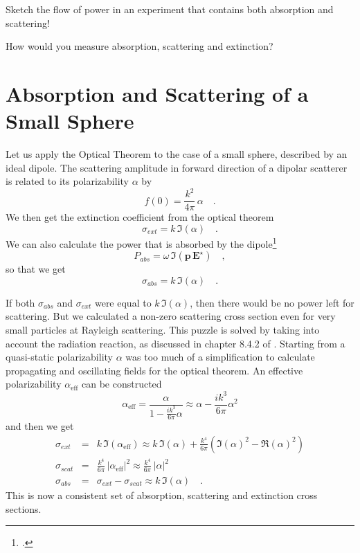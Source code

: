 \begin{questions}
  \item Sketch the flow of power in an experiment that contains both absorption and scattering!
  \item How would you measure absorption, scattering and extinction?
\end{questions}


\section{Absorption and Scattering of a Small Sphere}

Let us apply the Optical Theorem to the case of a small sphere, described by an ideal dipole.
The scattering amplitude in forward direction of a dipolar scatterer is related to its  polarizability $\alpha$ by 
\begin{equation}
 f(0) = \frac{k^2}{4 \pi} \, \alpha \quad .
\end{equation}
We  then get the extinction coefficient from the optical theorem
\begin{equation}
 \sigma_{ext} = k \, \Im ( \alpha ) \quad .
\end{equation}
We can also calculate the power that is absorbed by the dipole\footcite[Chapter 8]{Novotny-Hecht2012}
\begin{equation}
 P_{abs} = \omega \, \Im \left( \mathbf{p} \, \mathbf{E}^\star \right)  \quad ,
\end{equation}
so that we get 
\begin{equation}
 \sigma_{abs} = k \, \Im ( \alpha ) \quad .
\end{equation}

If both $\sigma_{abs}$ and $\sigma_{ext}$ were equal to $k \, \Im ( \alpha )$, then there would be no power left for scattering. But we calculated a non-zero scattering cross section even for very small particles at Rayleigh scattering.
This puzzle is solved by taking into account the radiation reaction, as discussed in chapter 8.4.2 of \cite{Novotny-Hecht2012}. Starting from a quasi-static polarizability $\alpha$ was too much of a simplification to calculate propagating and oscillating fields for the optical theorem. An effective polarizability $\alpha_{\text{eff}}$ can be constructed
\begin{equation}
 \alpha_{\text{eff}} = \frac{\alpha}{1 - \frac{i k^3 }{6 \pi} \alpha}
 \approx \alpha  - \frac{i k^3 }{6 \pi} \alpha^2
\end{equation}
and then we get
\begin{eqnarray}
 \sigma_{ext} &= & k \, \Im ( \alpha_{\text{eff}}  ) \approx 
 k \, \Im ( \alpha  )  + \frac{k^4}{6 \pi} \left( \Im (\alpha)^2 - \Re (\alpha)^2 \right) \\
  \sigma_{scat} & = &  \frac{k^4}{6 \pi }  \, |\alpha_{\text{eff}} |^2  \approx  \frac{k^4}{6 \pi }  \, |\alpha |^2 \\
   \sigma_{abs} &=&  \sigma_{ext} - \sigma_{scat} \approx  k \, \Im ( \alpha  )  \quad .
\end{eqnarray}
This is now a consistent set of absorption, scattering and extinction cross sections.


